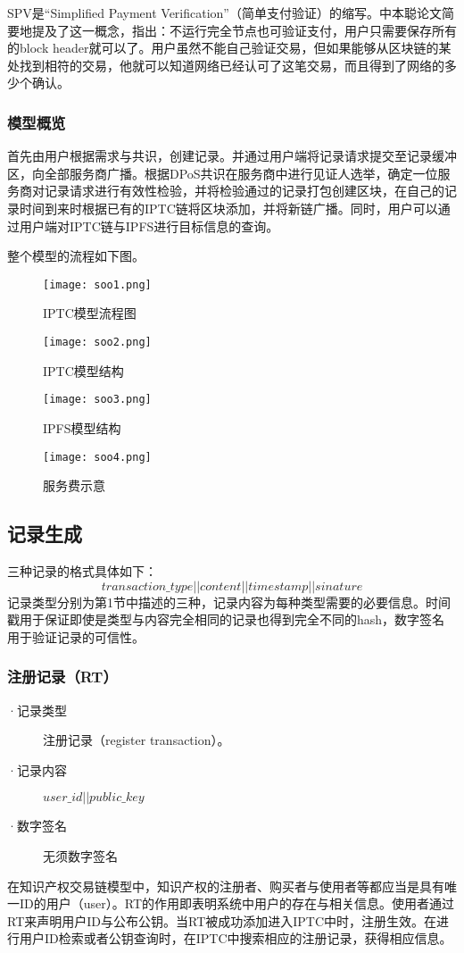 \documentclass[withoutpreface,bwprint]{cumcmthesis} %
\begin{document}
SPV是“Simplified Payment Verification”（简单支付验证）的缩写。中本聪论文简要地提及了这一概念，指出：不运行完全节点也可验证支付，用户只需要保存所有的block header就可以了。用户虽然不能自己验证交易，但如果能够从区块链的某处找到相符的交易，他就可以知道网络已经认可了这笔交易，而且得到了网络的多少个确认。

\subsubsection{模型概览}
首先由用户根据需求与共识，创建记录。并通过用户端将记录请求提交至记录缓冲区，向全部服务商广播。根据DPoS共识在服务商中进行见证人选举，确定一位服务商对记录请求进行有效性检验，并将检验通过的记录打包创建区块，在自己的记录时间到来时根据已有的IPTC链将区块添加，并将新链广播。同时，用户可以通过用户端对IPTC链与IPFS进行目标信息的查询。

整个模型的流程如下图。
\begin{figure}[h]
	\centering
	\texttt{[image: soo1.png]}
	\caption{IPTC模型流程图}
\end{figure}
\begin{figure}[h]
	\centering
	\texttt{[image: soo2.png]}
	\caption{IPTC模型结构}
\end{figure}
\begin{figure}[h]
	\centering
	\texttt{[image: soo3.png]}
	\caption{IPFS模型结构}
\end{figure}
\begin{figure}[h]
	\centering
	\texttt{[image: soo4.png]}
	\caption{服务费示意}
\end{figure}

\subsection{记录生成}
三种记录的格式具体如下：
\[transaction\_type||content||timestamp||sinature\]
记录类型分别为第1节中描述的三种，记录内容为每种类型需要的必要信息。时间戳用于保证即使是类型与内容完全相同的记录也得到完全不同的hash，数字签名用于验证记录的可信性。

\subsubsection{注册记录（RT）}
\begin{description}
	\item[·记录类型] 注册记录（register transaction）。
	\item[·记录内容] $user\_id || public\_key$
	\item[·数字签名] 无须数字签名
\end{description}
在知识产权交易链模型中，知识产权的注册者、购买者与使用者等都应当是具有唯一ID的用户（user）。RT的作用即表明系统中用户的存在与相关信息。使用者通过RT来声明用户ID与公布公钥。当RT被成功添加进入IPTC中时，注册生效。在进行用户ID检索或者公钥查询时，在IPTC中搜索相应的注册记录，获得相应信息。
\end{document}
